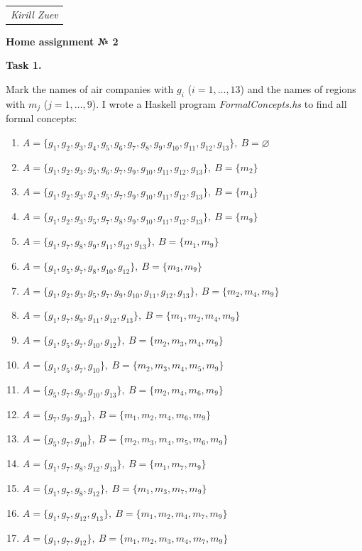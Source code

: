 \documentclass{article}
\begin{document}
\null\hfill\begin{tabular}[t]{l@{}}
	\textit{Kirill Zuev}
\end{tabular}

\begin{center}
	\textbf{Home assignment № 2}
\end{center}

\textbf{Task 1.}

Mark the names of air companies with $g_i$ ($i = 1, \dots, 13$) and the names of regions with $m_j$ ($j = 1, \dots, 9$). I wrote a Haskell program \textit{FormalConcepts.hs} to find all formal concepts:

\begin{enumerate}
	\item {$A = \{g_1,g_2,g_3,g_4,g_5,g_6,g_7,g_8,g_9,g_{10},g_{11},g_{12},g_{13}\},~B = \varnothing $}
	\item {$A = \{g_1,g_2,g_3,g_5,g_6,g_7,g_9,g_{10},g_{11},g_{12},g_{13}\},~B = \{m_2\}$}
	\item {$A = \{g_1,g_2,g_3,g_4,g_5,g_7,g_9,g_{10},g_{11},g_{12},g_{13}\},~B = \{m_4\}$}
	\item {$A = \{g_1,g_2,g_3,g_5,g_7,g_8,g_9,g_{10},g_{11},g_{12},g_{13}\},~B = \{m_9\}$}
	\item {$A = \{g_1,g_7,g_8,g_9,g_{11},g_{12},g_{13}\},~B = \{m_1,m_9\}$}
	\item {$A = \{g_1,g_5,g_7,g_8,g_{10},g_{12}\},~B = \{m_3,m_9\}$}
	\item {$A = \{g_1,g_2,g_3,g_5,g_7,g_9,g_{10},g_{11},g_{12},g_{13}\},~B = \{m_2,m_4,m_9\}$}
	\item {$A = \{g_1,g_7,g_9,g_{11},g_{12},g_{13}\},~B = \{m_1,m_2,m_4,m_9\}$}
	\item {$A = \{g_1,g_5,g_7,g_{10},g_{12}\},~B = \{m_2,m_3,m_4,m_9\}$}
	\item {$A = \{g_1,g_5,g_7,g_{10}\},~B = \{m_2,m_3,m_4,m_5,m_9\}$}
	\item {$A = \{g_5,g_7,g_9,g_{10},g_{13}\},~B = \{m_2,m_4,m_6,m_9\}$}
	\item {$A = \{g_7,g_9,g_13\},~B = \{m_1,m_2,m_4,m_6,m_9\}$}
	\item {$A = \{g_5,g_7,g_{10}\},~B = \{m_2,m_3,m_4,m_5,m_6,m_9\}$}
	\item {$A = \{g_1,g_7,g_8,g_{12},g_{13}\},~B = \{m_1,m_7,m_9\}$}
	\item {$A = \{g_1,g_7,g_8,g_{12}\},~B = \{m_1,m_3,m_7,m_9\}$}
	\item {$A = \{g_1,g_7,g_{12},g_{13}\},~B = \{m_1,m_2,m_4,m_7,m_9\}$}
	\item {$A = \{g_1,g_7,g_{12}\},~B = \{m_1,m_2,m_3,m_4,m_7,m_9\}$}

\end{enumerate}
\end{document}
